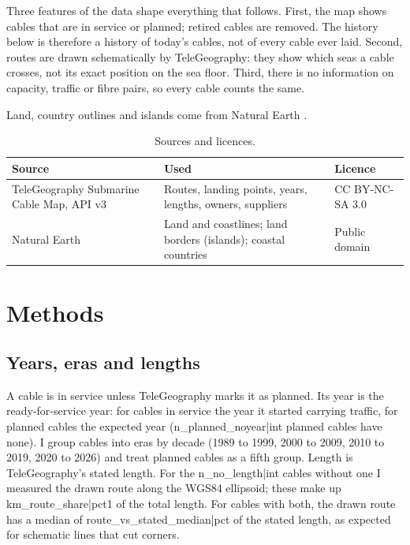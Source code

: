 \documentclass[11pt,a4paper]{article}
\begin{document}
Three features of the data shape everything that follows. First, the map shows cables that are in service or planned; retired cables are removed. The history below is therefore a history of today's cables, not of every cable ever laid. Second, routes are drawn schematically by TeleGeography: they show which seas a cable crosses, not its exact position on the sea floor. Third, there is no information on capacity, traffic or fibre pairs, so every cable counts the same.

Land, country outlines and islands come from Natural Earth \citep{naturalearth}.

\begin{table}[tbp]\centering\small\caption{Sources and licences.}\label{tab:sources}
\begin{tabular}{>{\raggedright\arraybackslash}p{4cm}>{\raggedright\arraybackslash}p{7.2cm}>{\raggedright\arraybackslash}p{3.2cm}}\toprule Source & Used & Licence\\\midrule
TeleGeography Submarine Cable Map, API v3 & Routes, landing points, years, lengths, owners, suppliers & CC BY-NC-SA 3.0\\
Natural Earth & Land and coastlines; land borders (islands); coastal countries & Public domain\\
\bottomrule\end{tabular}\end{table}

\section{Methods}
\subsection{Years, eras and lengths}
A cable is in service unless TeleGeography marks it as planned. Its year is the ready-for-service year: for cables in service the year it started carrying traffic, for planned cables the expected year ({{n_planned_noyear|int}} planned cables have none). I group cables into eras by decade (1989 to 1999, 2000 to 2009, 2010 to 2019, 2020 to 2026) and treat planned cables as a fifth group. Length is TeleGeography's stated length. For the {{n_no_length|int}} cables without one I measured the drawn route along the WGS84 ellipsoid; these make up {{km_route_share|pct1}} of the total length. For cables with both, the drawn route has a median of {{route_vs_stated_median|pct}} of the stated length, as expected for schematic lines that cut corners.
\end{document}
